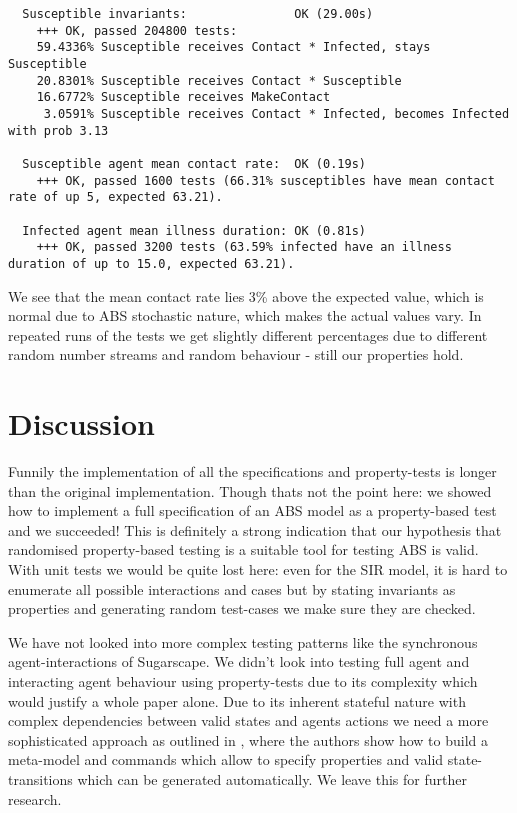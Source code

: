 \begin{verbatim}
  Susceptible invariants:               OK (29.00s)
    +++ OK, passed 204800 tests:
    59.4336% Susceptible receives Contact * Infected, stays Susceptible
    20.8301% Susceptible receives Contact * Susceptible
    16.6772% Susceptible receives MakeContact
     3.0591% Susceptible receives Contact * Infected, becomes Infected with prob 3.13
     
  Susceptible agent mean contact rate:  OK (0.19s)
    +++ OK, passed 1600 tests (66.31% susceptibles have mean contact rate of up 5, expected 63.21).
    
  Infected agent mean illness duration: OK (0.81s)
    +++ OK, passed 3200 tests (63.59% infected have an illness duration of up to 15.0, expected 63.21).
\end{verbatim}

We see that the mean contact rate lies 3\% above the expected value, which is normal due to ABS stochastic nature, which makes the actual values vary. In repeated runs of the tests we get slightly different percentages due to different random number streams and random behaviour - still our properties hold.

\section{Discussion}
Funnily the implementation of all the specifications and property-tests is longer than the original implementation. Though thats not the point here: we showed how to implement a full specification of an ABS model as a property-based test and we succeeded! This is definitely a strong indication that our hypothesis that randomised property-based testing is a suitable tool for testing ABS is valid. With unit tests we would be quite lost here: even for the SIR model, it is hard to enumerate all possible interactions and cases but by stating invariants as properties and generating random test-cases we make sure they are checked.

We have not looked into more complex testing patterns like the synchronous agent-interactions of Sugarscape. We didn't look into testing full agent and interacting agent behaviour using property-tests due to its complexity which would justify a whole paper alone. Due to its inherent stateful nature with complex dependencies between valid states and agents actions we need a more sophisticated approach as outlined in \cite{de_vries_-depth_2019}, where the authors show how to build a meta-model and commands which allow to specify properties and valid state-transitions which can be generated automatically. We leave this for further research.


